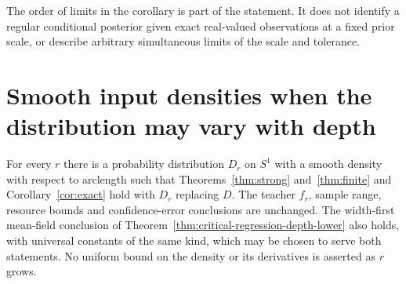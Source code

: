 \documentclass[11pt]{article}
\theoremstyle{remark}\newtheorem{remark}[theorem]{Remark}
\begin{document}
The order of limits in the corollary is part of the statement. It does
not identify a regular conditional posterior given exact real-valued
observations at a fixed prior scale, or describe arbitrary simultaneous
limits of the scale and tolerance.



\section{Smooth input densities when the distribution may vary with depth}
\label{sec:smoothing}
\begin{corollary}\label{cor:smooth}
For every $r$ there is a probability distribution $D_r$ on $S^1$
with a smooth density with respect to arclength such that
Theorems~\ref{thm:strong} and~\ref{thm:finite} and
Corollary~\ref{cor:exact} hold with $D_r$ replacing $D$.
The teacher $f_r$, sample range, resource bounds and confidence-error
conclusions are unchanged. The width-first mean-field conclusion of
Theorem~\ref{thm:critical-regression-depth-lower} also holds, with
universal constants of the same kind, which may be chosen to serve both
statements.
No uniform bound on the density or its
derivatives is asserted as $r$ grows.
\end{corollary}
\end{document}

